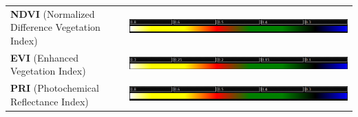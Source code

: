 \documentclass{article}
\begin{document}
{\begin{landscape}
\begin{tabularx}{\linewidth}{>{\arraybackslash}X>{\arraybackslash}X}
                    \vspace*{3\baselineskip}
                    \textbf{NDVI} (Normalized Difference Vegetation Index) & \vspace*{3\baselineskip} \begin{minipage}[t]{\linewidth}
                                                                                                            \vspace{-10pt}
                                                                                                            \includegraphics[width=\linewidth]{Figures/1.png}
                                                                                                         \end{minipage}\\
                    \vspace*{3\baselineskip}
                    \textbf{EVI} (Enhanced Vegetation Index) & \vspace*{2\baselineskip} \begin{minipage}[t]{\linewidth}
                                                                                                     \vspace{0pt}
                                                                                                     \includegraphics[width=\linewidth]{Figures/2.png}
                                                                                                  \end{minipage} \\
                    \vspace*{3\baselineskip}
                    \textbf{PRI} (Photochemical Reflectance Index) & \vspace*{1.7\baselineskip} \begin{minipage}[t]{\linewidth}
                                                                                                     \vspace{0pt}
                                                                                                     \includegraphics[width=\linewidth]{Figures/3.png}

\end{minipage}
\end{tabularx}
\end{landscape}}
\end{document}
